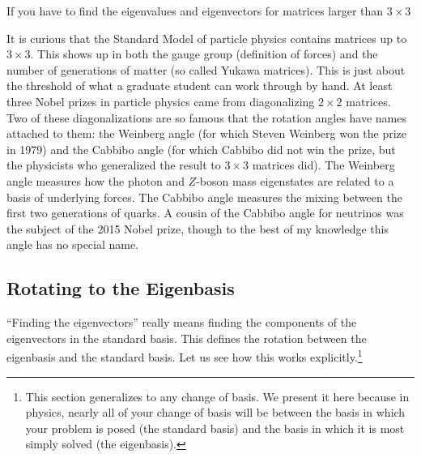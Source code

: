 \documentclass[12pt]{article}
\begin{document}
\begin{exercise}
If you have to find the eigenvalues and eigenvectors for matrices larger than $3\times 3$
\end{exercise}

\begin{example}
It is curious that the Standard Model of particle physics contains matrices up to $3\times 3$. This shows up in both the gauge group (definition of forces) and the number of generations of matter (so called Yukawa matrices). This is just about the threshold of what a graduate student can work through by hand. At least three Nobel prizes in particle physics came from diagonalizing $2\times 2$ matrices. Two of these diagonalizations are so famous that the rotation angles have names attached to them: the Weinberg angle (for which Steven Weinberg won the prize in 1979) and the Cabbibo angle (for which Cabbibo did not win the prize, but the physicists who generalized the result to $3\times 3$ matrices did). The Weinberg angle measures how the photon and $Z$-boson mass eigenstates are related to a basis of underlying forces. The Cabbibo angle measures the mixing between the first two generations of quarks. A cousin of the Cabbibo angle for neutrinos was the subject of the 2015 Nobel prize, though to the best of my knowledge this angle has no special name.
\end{example}

\subsection{Rotating to the Eigenbasis}

``Finding the eigenvectors'' really means finding the components of the eigenvectors in the standard basis. This defines the rotation between the eigenbasis and the standard basis. Let us see how this works explicitly.\footnote{This section generalizes to any change of basis. We present it here because in physics, nearly all of your change of basis will be between the basis in which your problem is posed (the standard basis) and the basis in which it is most simply solved (the eigenbasis).}
\end{document}
